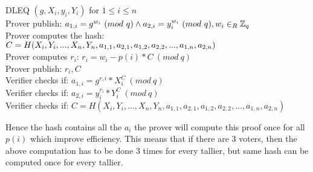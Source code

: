 \begin{infobox}
DLEQ \begin{math}(g,X_i,y_i,Y_i) \end{math} for  \begin{math}1\leq i \leq n \end{math}  \\
Prover publish: \begin{math}a_{1,i}=g^{w_i} \ (mod\ q)  \land a_{2,i}=y_i^{w_i} \ (mod\ q),  w_i\in_R \Z_q \end{math}\\
Prover computes the hash: \begin{math}C=H(X_i,Y_i,...,X_n,Y_n,a_{1,1},a_{2,1},\\a_{1,2},a_{2,2},...,a_{1,n},a_{2,n})\end{math}\\
Prover computes \begin{math}r_i\end{math}:  \begin{math}r_i=w_i-p(i) * C \ (mod\ q)\end{math}\\
Prover publish:  \begin{math}r_i,C\end{math}\\
Verifier checks if:  \begin{math}a_{1,i} = g^{r,i}*X_i^C \ (mod\ q) \end{math}\\
Verifier checks if:  \begin{math} a_{2,i}=y_i^{r_{i}} * Y_i^C \ (mod\ q)\end{math}\\ 
Verifier checks if:  \begin{math}C=H(X_i,Y_i,...,X_n,Y_n,a_{1,1},a_{2,1},a_{1,2},a_{2,2},...,a_{1,n},a_{2,n})\end{math}

\label{info:DLEQ_optimized}
\end{infobox}

 Hence the hash contains all the  \begin{math}a_i \end{math} the prover will compute this proof once for all  \begin{math}p(i) \end{math} which improve efficiency. This means that if there are 3 voters, then the above computation has to be done 3 times for every tallier, but same hash can be computed once for every tallier. 

